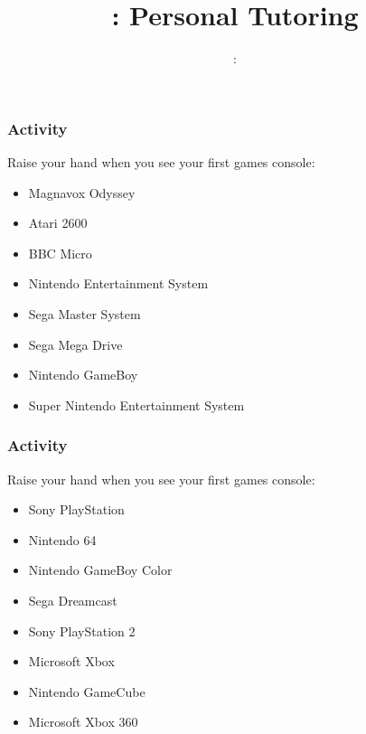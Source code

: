 \usepackage{../../beamerthemeFalmouthGamesAcademy}
\usepackage{multimedia}
\graphicspath{ {../../} }


\usepackage[normalem]{ulem}
\usepackage{wasysym}

\usepackage{pdfpages}

\usetikzlibrary{arrows,automata}




\title{\sessionnumber: Personal Tutoring}
\subtitle{\modulecode: \moduletitle}

\frame{\titlepage} 

\begin{frame}
	\frametitle{Activity}
	
	Raise your hand when you see your first games console:
	
	\begin{itemize}
		\item Magnavox Odyssey \pause
		\item Atari 2600 \pause
		\item BBC Micro \pause
		\item Nintendo Entertainment System \pause
		\item Sega Master System \pause
		\item Sega Mega Drive \pause
		\item Nintendo GameBoy \pause
		\item Super Nintendo Entertainment System

	\end{itemize}
\end{frame}

\begin{frame}
	\frametitle{Activity}
	
	Raise your hand when you see your first games console:
	
	\begin{itemize}
		\item Sony PlayStation \pause
		\item Nintendo 64 \pause
		\item Nintendo GameBoy Color \pause
		\item Sega Dreamcast \pause
		\item Sony PlayStation 2 \pause
		\item Microsoft Xbox \pause
		\item Nintendo GameCube \pause
		\item Microsoft Xbox 360 
	\end{itemize}
\end{frame}

